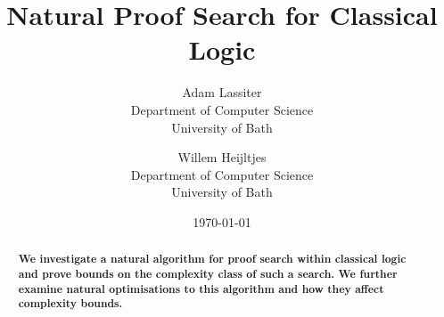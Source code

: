 \documentclass[draft]{article}
\title{Natural Proof Search for Classical Logic}
\author{Adam Lassiter\\Department of Computer Science\\University of Bath \and Willem Heijltjes\\Department of Computer Science\\University of Bath}
\date{\today}
\theoremstyle{indented}
\begin{document}
    \maketitle
    \begin{abstract}
        \textbf{
            We investigate a natural algorithm for proof search within classical logic and prove bounds on the complexity class of such a search.
            We further examine natural optimisations to this algorithm and how they affect complexity bounds.
        }
    \end{abstract}

    

    
 
    

    

    
\end{document}

